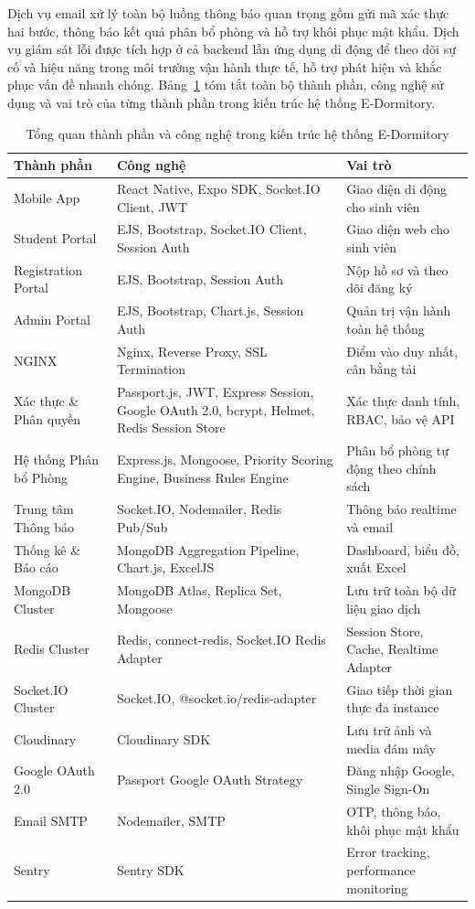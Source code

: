 \documentclass[../DoAn.tex]{subfiles}
\begin{document}
Dịch vụ email xử lý toàn bộ luồng thông báo quan trọng gồm gửi mã xác thực
hai bước, thông báo kết quả phân bổ phòng và hỗ trợ khôi phục mật khẩu. Dịch vụ
giám sát lỗi được tích hợp ở cả backend lẫn ứng dụng di động để theo dõi sự cố
và hiệu năng trong môi trường vận hành thực tế, hỗ trợ phát hiện và khắc phục
vấn đề nhanh chóng. Bảng~\ref{tab:component_overview} tóm tắt toàn bộ thành
phần, công nghệ sử dụng và vai trò của từng thành phần trong kiến trúc hệ thống
E-Dormitory.

\begin{table}[H]
\centering
\caption{Tổng quan thành phần và công nghệ trong kiến trúc hệ thống E-Dormitory}
\label{tab:component_overview}
\small
\begin{tabular}{|p{3.4cm}|p{4.8cm}|p{4.4cm}|}
\hline
\textbf{Thành phần} & \textbf{Công nghệ} & \textbf{Vai trò} \\
\hline
Mobile App
  & React Native, Expo SDK, Socket.IO Client, JWT
  & Giao diện di động cho sinh viên \\
\hline
Student Portal
  & EJS, Bootstrap, Socket.IO Client, Session Auth
  & Giao diện web cho sinh viên \\
\hline
Registration Portal
  & EJS, Bootstrap, Session Auth
  & Nộp hồ sơ và theo dõi đăng ký \\
\hline
Admin Portal
  & EJS, Bootstrap, Chart.js, Session Auth
  & Quản trị vận hành toàn hệ thống \\
\hline
NGINX
  & Nginx, Reverse Proxy, SSL Termination
  & Điểm vào duy nhất, cân bằng tải \\
\hline
Xác thực \& Phân quyền
  & Passport.js, JWT, Express Session, Google OAuth 2.0, bcrypt, Helmet, Redis Session Store
  & Xác thực danh tính, RBAC, bảo vệ API \\
\hline
Hệ thống Phân bổ Phòng
  & Express.js, Mongoose, Priority Scoring Engine, Business Rules Engine
  & Phân bổ phòng tự động theo chính sách \\
\hline
Trung tâm Thông báo
  & Socket.IO, Nodemailer, Redis Pub/Sub
  & Thông báo realtime và email \\
\hline
Thống kê \& Báo cáo
  & MongoDB Aggregation Pipeline, Chart.js, ExcelJS
  & Dashboard, biểu đồ, xuất Excel \\
\hline
MongoDB Cluster
  & MongoDB Atlas, Replica Set, Mongoose
  & Lưu trữ toàn bộ dữ liệu giao dịch \\
\hline
Redis Cluster
  & Redis, connect-redis, Socket.IO Redis Adapter
  & Session Store, Cache, Realtime Adapter \\
\hline
Socket.IO Cluster
  & Socket.IO, @socket.io/redis-adapter
  & Giao tiếp thời gian thực đa instance \\
\hline
Cloudinary
  & Cloudinary SDK
  & Lưu trữ ảnh và media đám mây \\
\hline
Google OAuth 2.0
  & Passport Google OAuth Strategy
  & Đăng nhập Google, Single Sign-On \\
\hline
Email SMTP
  & Nodemailer, SMTP
  & OTP, thông báo, khôi phục mật khẩu \\
\hline
Sentry
  & Sentry SDK
  & Error tracking, performance monitoring \\
\hline
\end{tabular}
\end{table}
\end{document}
